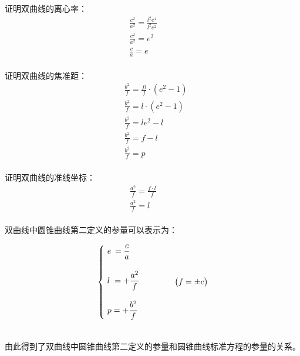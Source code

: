 \documentclass[UTF8]{ctexart}
\begin{document}
\newpage

    证明双曲线的离心率：
    \begin{align}
        &\frac{c^2}{a^2}=\frac{l^2e^4}{l^2e^2}~~~~~~~~~~~~~~\\[3mm]
        &\frac{c^2}{a^2}=e^2\\[3mm]
        &\frac{c}{a}=e
    \end{align}\\
    证明双曲线的焦准距：
    \begin{align}
        &\frac{b^2}{f}=\frac{fl}{f}\cdot\left(e^2-1\right)\\[3mm]
        &\frac{b^2}{f}=l\cdot\left(e^2-1\right)\\[3mm]
        &\frac{b^2}{f}=le^2-l\\[3mm]
        &\frac{b^2}{f}=f-l\\[3mm]
        &\frac{b^2}{f}=p
    \end{align}\\
    证明双曲线的准线坐标：
    \begin{align}
        &\frac{a^2}{f}=\frac{f\cdot l}{f}~~~~~~~~~~~~~~\\[3mm]
        &\frac{a^2}{f}=l
    \end{align}\\
    双曲线中圆锥曲线第二定义的参量可以表示为：\vspace{3pt}
    \begin{large}
        \begin{equation*}
            \begin{cases}
                ~e\hspace{2.0pt}=\dfrac{c}{a}\\[6mm]
                ~l\hspace{3.0pt}=+\dfrac{a^2}{f}\\[6mm]
                ~p=+\dfrac{b^2}{f}
            \end{cases}~~~~~~~~~\big(f=\pm c\big)
        \end{equation*}
    \end{large}\\
    由此得到了双曲线中圆锥曲线第二定义的参量和圆锥曲线标准方程的参量的关系。

\newpage
\end{document}
